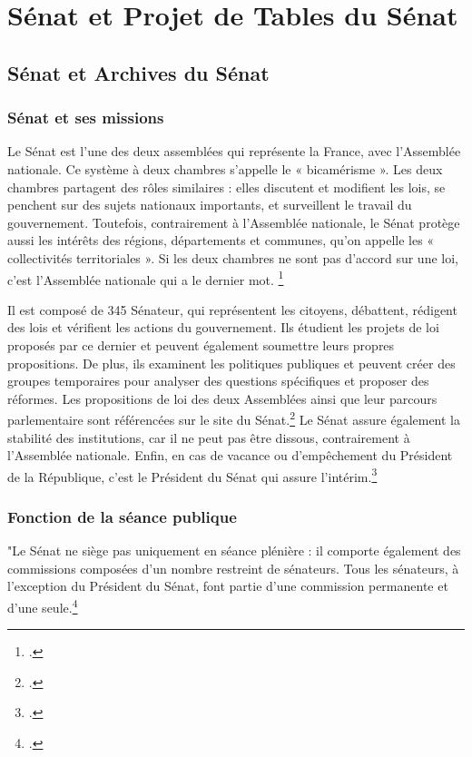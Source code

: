 
\chapter{Sénat et Projet de Tables du Sénat}

\section{Sénat et Archives du Sénat}

\subsection{Sénat et ses missions}
Le Sénat est l'une des deux assemblées qui représente la France, avec l'Assemblée nationale. Ce système à deux chambres s'appelle le « bicamérisme ». Les deux chambres partagent des rôles similaires : elles discutent et modifient les lois, se penchent sur des sujets nationaux importants, et surveillent le travail du gouvernement. Toutefois, contrairement à l'Assemblée nationale, le Sénat protège aussi les intérêts des régions, départements et communes, qu'on appelle les « collectivités territoriales ». Si les deux chambres ne sont pas d'accord sur une loi, c'est l'Assemblée nationale qui a le dernier mot. \footcite{Essentiel}

Il est composé de 345 Sénateur, qui représentent les citoyens, débattent, rédigent des lois et vérifient les actions du gouvernement. Ils étudient les projets de loi proposés par ce dernier et peuvent également soumettre leurs propres propositions. De plus, ils examinent les politiques publiques et peuvent créer des groupes temporaires pour analyser des questions spécifiques et proposer des réformes. Les propositions de loi des deux Assemblées ainsi que leur parcours parlementaire sont référencées sur le site du Sénat.\footcite{indexpropositionsdeloi} Le Sénat assure également la stabilité des institutions, car il ne peut pas être dissous, contrairement à l'Assemblée nationale. Enfin, en cas de vacance ou d'empêchement du Président de la République, c'est le Président du Sénat qui assure l'intérim.\footcite{Essentiel}

\subsection{Fonction de la séance publique}
"Le Sénat ne siège pas uniquement en séance plénière : il comporte également des commissions composées d’un nombre restreint de sénateurs. Tous les sénateurs, à l’exception du Président du Sénat, font partie d’une commission permanente et d’une seule.\footcite{Recueildefichesdusenat}


